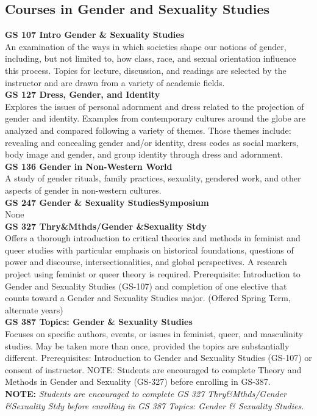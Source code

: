 \documentclass[
  letterpaper,
]{scrbook}
\begin{document}
\subsection{Courses in Gender and Sexuality
Studies}\label{courses-in-gender-and-sexuality-studies}

\textbf{GS 107 Intro Gender \& Sexuality Studies}\\
An examination of the ways in which societies shape our notions of
gender, including, but not limited to, how class, race, and sexual
orientation influence this process. Topics for lecture, discussion, and
readings are selected by the instructor and are drawn from a variety of
academic fields.\\
\textbf{GS 127 Dress, Gender, and Identity}\\
Explores the issues of personal adornment and dress related to the
projection of gender and identity. Examples from contemporary cultures
around the globe are analyzed and compared following a variety of
themes. Those themes include: revealing and concealing gender and/or
identity, dress codes as social markers, body image and gender, and
group identity through dress and adornment.\\
\textbf{GS 136 Gender in Non-Western World}\\
A study of gender rituals, family practices, sexuality, gendered work,
and other aspects of gender in non-western cultures.\\
\textbf{GS 247 Gender \& Sexuality StudiesSymposium}\\
None\\
\textbf{GS 327 Thry\&Mthds/Gender \&Sexuality Stdy}\\
Offers a thorough introduction to critical theories and methods in
feminist and queer studies with particular emphasis on historical
foundations, questions of power and discourse, intersectionalities, and
global perspectives. A research project using feminist or queer theory
is required. Prerequisite: Introduction to Gender and Sexuality Studies
(GS-107) and completion of one elective that counts toward a Gender and
Sexuality Studies major. (Offered Spring Term, alternate years)\\
\textbf{GS 387 Topics: Gender \& Sexuality Studies}\\
Focuses on specific authors, events, or issues in feminist, queer, and
masculinity studies. May be taken more than once, provided the topics
are substantially different. Prerequisites: Introduction to Gender and
Sexuality Studies (GS-107) or consent of instructor. NOTE: Students are
encouraged to complete Theory and Methods in Gender and Sexuality
(GS-327) before enrolling in GS-387.\\
\textbf{NOTE:} \emph{Students are encouraged to complete GS 327
Thry\&Mthds/Gender \&Sexuality Stdy before enrolling in GS 387 Topics:
Gender \& Sexuality Studies. }
\end{document}
